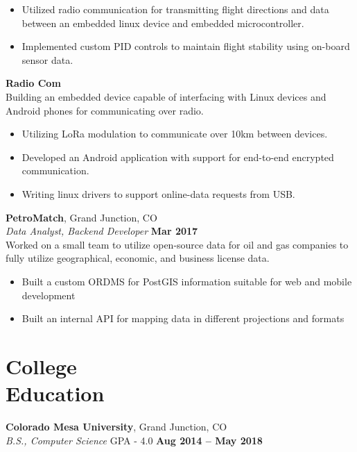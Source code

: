 \documentclass[margin,line]{resume}
\begin{document}
\begin{resume}
	\begin{itemize}
	\item Utilized radio communication for transmitting
	      flight directions and data between an embedded linux
	      device and embedded microcontroller.
	\item Implemented custom PID controls to maintain flight stability
	      using on-board sensor data.
	\end{itemize}

    \textbf{Radio Com}\\
    Building an embedded device capable of interfacing with Linux devices and
    Android phones for communicating over radio.

	\begin{itemize}
	\item Utilizing LoRa modulation to communicate over 10km between
	      devices.
	\item Developed an Android application with support for end-to-end
	      encrypted communication.
	\item Writing linux drivers to support online-data requests from
	      USB.
	\end{itemize}


    \textbf{PetroMatch}, Grand Junction, CO \vspace{2mm}\\\vspace{1mm}%
    \textsl{Data Analyst, Backend Developer} \hfill \textbf{Mar 2017}\\
    Worked on a small team to utilize open-source data for oil and gas companies
    to fully utilize geographical, economic, and business license data.

	\begin{itemize}
	\item Built a custom ORDMS for PostGIS information suitable for web and
	      mobile development
	\item Built an internal API for mapping data in different projections and
	      formats
	\end{itemize}
    
    \section{\mysidestyle College\\Education}

    \textbf{Colorado Mesa University}, Grand Junction, CO \vspace{2mm}\\\vspace{1mm}%
    \textsl{B.S., Computer Science} GPA - 4.0 \hfill \textbf{Aug 2014 -- May 2018}\\
    

\end{resume}
\end{document}
